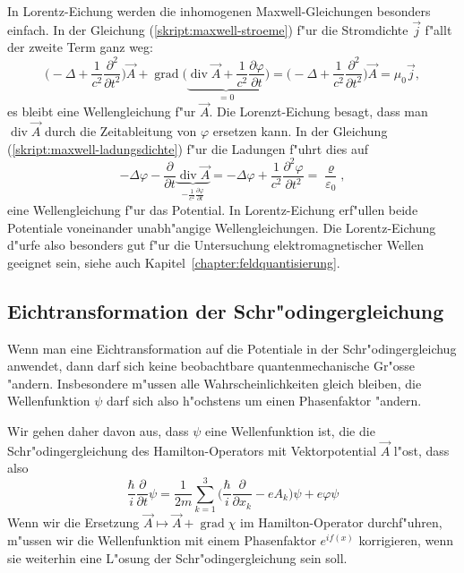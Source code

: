 In Lorentz-Eichung werden die inhomogenen Maxwell-Gleichungen
besonders einfach.
In der Gleichung (\ref{skript:maxwell-stroeme})
f"ur die Stromdichte $\vec j$ f"allt der zweite Term ganz weg:
\[
\biggl(-\Delta + \frac1{c^2}\frac{\partial^2}{\partial t^2}\biggr)\vec A
+\operatorname{grad}\biggl(\underbrace{\operatorname{div}\vec A +\frac1{c^2}\frac{\partial\varphi}{\partial t}}_{=0}\biggr)
=
\biggl(-\Delta + \frac1{c^2}\frac{\partial^2}{\partial t^2}\biggr)\vec A
=\mu_0\vec j,
\]
es bleibt eine Wellengleichung f"ur $\vec A$. Die Lorenzt-Eichung
besagt, dass man $\operatorname{div}\vec A$ durch die Zeitableitung
von $\varphi$ ersetzen kann.
In der Gleichung (\ref{skript:maxwell-ladungsdichte}) f"ur die Ladungen
f"uhrt dies auf
\[
-\Delta\varphi -\frac{\partial}{\partial t}\underbrace{\operatorname{div}\vec A}_{-\frac1{c^2}\frac{\partial\varphi}{\partial t}}
=
-\Delta\varphi +\frac1{c^2}\frac{\partial^2\varphi}{\partial t^2}
=\frac{\varrho}{\varepsilon_0},
\]
eine Wellengleichung f"ur das Potential.
In Lorentz-Eichung erf"ullen beide Potentiale voneinander
unabh"angige Wellengleichungen.
Die Lorentz-Eichung d"urfe also besonders gut f"ur die Untersuchung
elektromagnetischer Wellen geeignet sein, siehe auch
Kapitel~\ref{chapter:feldquantisierung}.

\subsection{Eichtransformation der Schr"odingergleichung}
Wenn man eine Eichtransformation auf die Potentiale in der
Schr"odingergleichug anwendet, dann darf sich keine beobachtbare
quantenmechanische Gr"osse "andern. Insbesondere m"ussen alle
Wahrscheinlichkeiten gleich bleiben, die Wellenfunktion
$\psi$ darf sich also h"ochstens um einen Phasenfaktor "andern.

Wir gehen daher davon aus, dass $\psi$ eine Wellenfunktion ist,
die die Schr"odingergleichung des Hamilton-Operators mit Vektorpotential
$\vec A$ l"ost, dass also
\[
\frac{\hbar}{i}\frac{\partial}{\partial t}\psi
=
\frac1{2m}\sum_{k=1}^3\biggl(\frac{\hbar}{i}\frac{\partial}{\partial x_k}-eA_k\biggr)\psi
+e\varphi\psi
\]
Wenn wir die Ersetzung
$\vec A\mapsto \vec A+\operatorname{grad}\chi$
im Hamilton-Operator durchf"uhren, m"ussen wir die Wellenfunktion
mit einem Phasenfaktor $e^{if(x)}$ korrigieren, wenn sie weiterhin
eine L"osung der Schr"odingergleichung sein soll.

